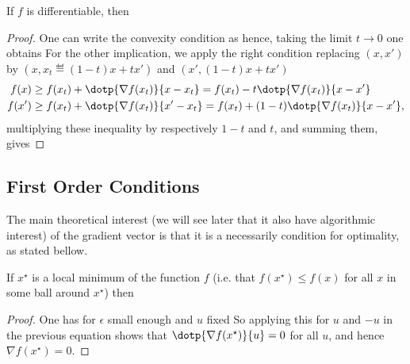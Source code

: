 \begin{prop}\label{prop-above-tgt}
	If $f$ is differentiable, then
\end{prop}
\begin{proof}
	One can write the convexity condition as
	hence, taking the limit $t \rightarrow 0$ one obtains
	For the other implication, we apply the right condition replacing $(x,x')$ by $(x, x_t \eqdef (1-t)x+t x')$
	and $(x', (1-t)x+t x')$
	\begin{align*}
		f(x)  & \geq f(x_t) + \dotp{\nabla f(x_t)}{x-x_t} = f(x_t) - t \dotp{\nabla f(x_t)}{x-x'} \\
		f(x') & \geq f(x_t) + \dotp{\nabla f(x_t)}{x'-x_t} = f(x_t) + (1-t) \dotp{\nabla f(x_t)}{x-x'}, 
	\end{align*}
	multiplying these inequality by respectively $1-t$ and $t$, and summing them, gives
\end{proof}


\subsection{First Order Conditions}

The main theoretical interest (we will see later that it also have algorithmic interest) of the gradient vector is that it is a necessarily condition for optimality, as stated bellow. 

\begin{prop}\label{prop-cs-min} 
If $x^\star$ is a local minimum of the function $f$ (i.e. that $f(x^\star) \leq f(x)$ for all $x$ in some ball around $x^\star$) then 
\end{prop}
\begin{proof}
One has for $\epsilon$ small enough and $u$ fixed 
So applying this for $u$ and $-u$ in the previous equation shows that $\dotp{\nabla f(x^\star)}{u}=0$ for all $u$, and hence $\nabla f(x^\star)=0$.
\end{proof}

